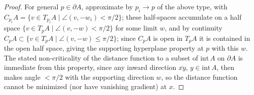 \begin{proof}
  For general $p\in\partial A$, approximate by $p_i\to p$ of the above type,
  with $C_{p_i}A=\{v\in T_{p_i}A\mid\angle(v,-w_i)<\pi/2\}$; these half-spaces
  accumulate on a half space $\{v\in T_pA\mid\angle(v,-w)<\pi/2\}$ for some
  limit $w$, and by continuity $C_pA\subset\{v\in T_pA\mid\angle(v,-w)\le\pi/2\}$;
  since $C_pA$ is open in $T_pA$ it is contained in the open half space, giving
  the supporting hyperplane property at $p$ with this $w$. The stated
  non-criticality of the distance function to a subset of $\mathrm{int}\,A$ on
  $\partial A$ is immediate from this property, since any inward direction
  $\overline{xy}$, $y\in\mathrm{int}\,A$, then makes angle $<\pi/2$ with the
  supporting direction $w$, so the distance function cannot be minimized (nor
  have vanishing gradient) at $x$.
\end{proof}

